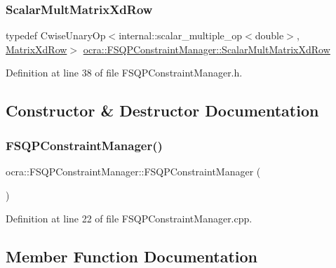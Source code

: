 \subsubsection{\texorpdfstring{Scalar\+Mult\+Matrix\+Xd\+Row}{ScalarMultMatrixXdRow}}
{\footnotesize\ttfamily typedef Cwise\+Unary\+Op$<$internal\+::scalar\+\_\+multiple\+\_\+op$<$double$>$, \hyperlink{namespaceocra_a608bf0522317ed1df3bbfc6a5753bc01}{Matrix\+Xd\+Row}$>$ \hyperlink{classocra_1_1FSQPConstraintManager_abe1cf7412d42b4a1b7158936a24ae6fb}{ocra\+::\+F\+S\+Q\+P\+Constraint\+Manager\+::\+Scalar\+Mult\+Matrix\+Xd\+Row}}



Definition at line 38 of file F\+S\+Q\+P\+Constraint\+Manager.\+h.



\subsection{Constructor \& Destructor Documentation}
\hypertarget{classocra_1_1FSQPConstraintManager_adce56c9faf54d60f6a2a01db9db36310}{}\label{classocra_1_1FSQPConstraintManager_adce56c9faf54d60f6a2a01db9db36310} 
\subsubsection{\texorpdfstring{F\+S\+Q\+P\+Constraint\+Manager()}{FSQPConstraintManager()}}
{\footnotesize\ttfamily ocra\+::\+F\+S\+Q\+P\+Constraint\+Manager\+::\+F\+S\+Q\+P\+Constraint\+Manager (\begin{DoxyParamCaption}{ }\end{DoxyParamCaption})}



Definition at line 22 of file F\+S\+Q\+P\+Constraint\+Manager.\+cpp.



\subsection{Member Function Documentation}
\hypertarget{classocra_1_1FSQPConstraintManager_a17e4f4d67bd1cda3e88003e3409ea747}{}\label{classocra_1_1FSQPConstraintManager_a17e4f4d67bd1cda3e88003e3409ea747} 
